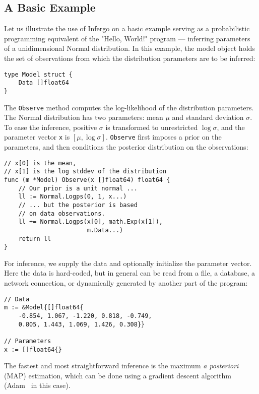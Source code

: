 \documentclass[sigplan,review,10pt,anonymous]{acmart}
\begin{document}
\begin{sloppypar}
\subsection{A Basic Example}

Let us illustrate the use of Infergo on a basic example serving
as a probabilistic programming equivalent of the "Hello, World!"
program --- inferring parameters of a unidimensional Normal
distribution. In this example, the model object holds the set of
observations from which the distribution parameters are to be
inferred:
\begin{lstlisting}
type Model struct {
    Data []float64
}
\end{lstlisting}

The \lstinline{Observe} method computes the log-likelihood of
the distribution parameters. The Normal distribution has two
parameters: mean $\mu$ and standard deviation $\sigma$. To ease
the inference, positive $\sigma$ is transformed to unrestricted
$\log \sigma$, and the parameter vector \lstinline{x} is $[\mu,
\log \sigma]$. \lstinline{Observe} first imposes a prior on the
parameters, and then conditions the posterior distribution on
the observations:

\begin{lstlisting}
// x[0] is the mean,
// x[1] is the log stddev of the distribution
func (m *Model) Observe(x []float64) float64 {
    // Our prior is a unit normal ...
    ll := Normal.Logps(0, 1, x...)
    // ... but the posterior is based 
	// on data observations.
	ll += Normal.Logps(x[0], math.Exp(x[1]),
	                   m.Data...)
    return ll
}
\end{lstlisting}

For inference, we supply the data and optionally initialize the
parameter vector. Here the data is hard-coded, but in general
can be read from a file, a database, a network connection,
or dynamically generated by another part of the program:

\begin{lstlisting}
// Data
m := &Model{[]float64{
	-0.854, 1.067, -1.220, 0.818, -0.749,
	0.805, 1.443, 1.069, 1.426, 0.308}}

// Parameters
x := []float64{}
\end{lstlisting}
	
The fastest and most straightforward inference is the maximum
\textit{a posteriori} (MAP) estimation, which can be done using
a gradient descent algorithm (Adam~\cite{KB15} in this case).


\end{sloppypar}
\end{document}
